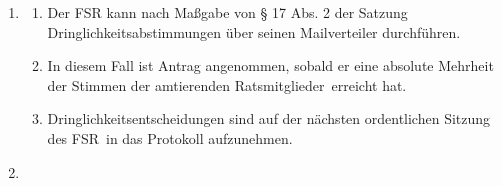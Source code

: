 \documentclass[a4paper, 12pt, ngerman]{article}
\newcommand{\rates}{FSR}
\newcommand{\go}{GO}
\newcommand{\mitglieder}{Ratsmitglieder}
\begin{document}
\begin{enumerate}[leftmargin=0cm]
	\begin{enumerate}[leftmargin=0cm]
		\item Die Sitzungsleitung gibt vor einer Abstimmung den Wortlaut 
		des Antrags bekannt.
		\item Im Falle konkurrierender Anträge, ist über den weitestgehenden Antrag zuerst abzustimmen.
		Die Sitzungsleitung schlägt eine Reihung der Anträge vor; über Widerspruch einer antragsstellenden Person entscheiden die anwesenden \mitglieder~durch Abstimmung. Sobald ein Antrag die notwendige Mehrheit gefunden hat, entfallen
		alle Übrigen. 
		\item Abstimmungen erfolgen auf einer Sitzung grundsätzlich offen per Handzeichen.
		Die Konsensbildung ist anzustreben.
		\item Die Bestimmung der Sitzungsleitung und der Protokollführung nach  gelten als Abstimmungen im Sinne dieser \go.
	\end{enumerate}
		

	\item {}\label{dringlichkeit}
	
	\begin{enumerate}[leftmargin=0cm]
		\item Der FSR kann nach Maßgabe von § 17 Abs. 2 der Satzung Dringlichkeitsabstimmungen über seinen Mailverteiler durchführen. 
		\item In diesem Fall ist Antrag angenommen, sobald er eine absolute Mehrheit der Stimmen der amtierenden \mitglieder~erreicht hat.
		\item Dringlichkeitsentscheidungen sind auf der nächsten ordentlichen Sitzung des \rates~in das Protokoll aufzunehmen.
	\end{enumerate}

	
	\item {}\label{go-antrage}
	

\end{enumerate}
\end{document}
